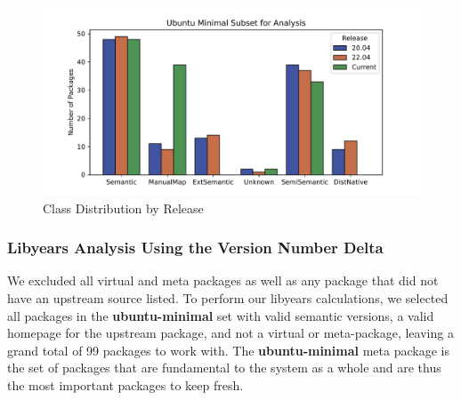 \documentclass[sn-mathphys-num]{sn-jnl}%
\theoremstyle{thmstyleone}%
\theoremstyle{thmstyletwo}%
\theoremstyle{thmstylethree}%
\begin{document}
\begin{figure}[h]
    \centering
    \includegraphics[width=\columnwidth]{figures/class-distribution-by-release.pdf}
    \caption{Class Distribution by Release}
    \label{fig:class-by-release}
\end{figure}

\subsubsection{\textbf{Libyears Analysis Using the Version Number Delta}}
\label{sec:vnd}

We excluded all virtual and meta packages as well as any package that did not have an upstream source listed. To perform our libyears calculations, we selected all packages in the \textbf{ubuntu-minimal} set with valid semantic versions, a valid homepage for the upstream package, and not a virtual or meta-package, leaving a grand total of 99 packages to work with. The \textbf{ubuntu-minimal} meta package is the set of packages that are fundamental to the system as a whole and are thus the most important packages to keep fresh.
\end{document}
